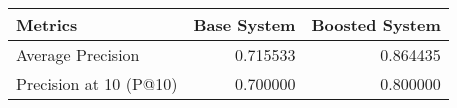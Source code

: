 \begin{tabular}{lrr}
\toprule
               Metrics &  Base System &  Boosted System \\
\midrule
     Average Precision &     0.715533 &        0.864435 \\
Precision at 10 (P@10) &     0.700000 &        0.800000 \\
\bottomrule
\end{tabular}
